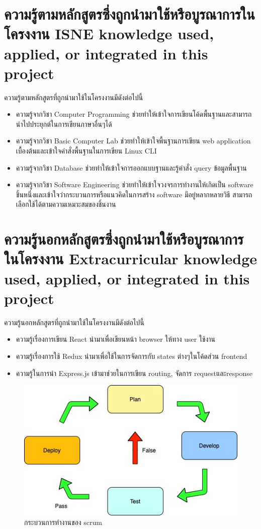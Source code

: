 \section{\ifcpe%
ความรู้ตามหลักสูตรซึ่งถูกนำมาใช้หรือบูรณาการในโครงงาน
\else%
ISNE knowledge used, applied, or integrated in this project
\fi
}

ความรู้ตามหลักสูตรที่ถูกนำมาใช้ในโครงงานมีดังต่อไปนี้
\begin{itemize}
  \item ความรู้จากวิชา Computer Programming ช่วยทำให้เข้าใจการเขียนโค้ดพื้นฐานและสามารถนำไปประยุกต์ในการเขียนภาษาอื่นๆได้
  \item ความรู้จากวิชา Basic Computer Lab ช่วยทำให้เข้าใจพื้นฐานการเขียน web application เบื้องต้นและเข้าใจคำสั่งพื้นฐานในการเขียน Linux CLI
  \item ความรู้จากวิชา Database ช่วยทำให้เข้าใจการออกแบบฐานและรู้คำสั่ง query ข้อมูลพื้นฐาน
  \item ความรู้จากวิชา Software Engineering ช่วยทำให้เข้าใจวงจรการทำงานให้เกิดเป็น software ชิ้นหนึ่งและเข้าใจว่ากระบวนการหรือแนวคิดในการสร้าง software มีอยู่หลากหลายวิธี สามารถเลือกใช้ได้ตามความเหมาะสมของชิ้นงาน 
  
\end{itemize}


\section{\ifcpe%
ความรู้นอกหลักสูตรซึ่งถูกนำมาใช้หรือบูรณาการในโครงงาน
\else%
Extracurricular knowledge used, applied, or integrated in this project
\fi
}

ความรู้นอกหลักสูตรที่ถูกนำมาใช้ในโครงงานมีดังต่อไปนี้
\begin{itemize}
  \item ความรู้เรื่องการเขียน React นำมาเพื่อเขียนหน้า browser ให้ทาง user ใช้งาน
  \item ความรู้เรื่องการใช้ Redux นำมาเพื่อใช้ในการจัดการกับ states ต่างๆในโค้ดส่วน frontend
  \item ความรู้ในการนำ Express.js เข้ามาช่วยในการเขียน routing, จัดการ requestและresponse
\end{itemize}


\begin{figure}
  \begin{center}
    \includegraphics[width=\linewidth]{images/scrum.jpeg}
  \end{center}
  \caption[กระบวนการทำงานของ scrum]{กระบวนการทำงานของ scrum}
  \label{fig:Scrum}
\end{figure}
